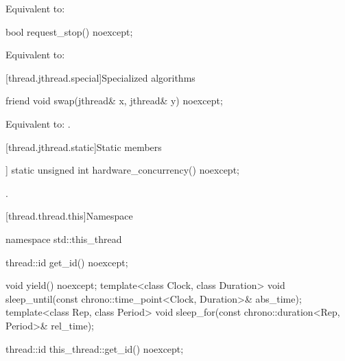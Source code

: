 \begin{itemdescr}
\pnum
\effects
Equivalent to: 
\end{itemdescr}

%
\begin{itemdecl}
bool request_stop() noexcept;
\end{itemdecl}

\begin{itemdescr}
\pnum
\effects
Equivalent to: 
\end{itemdescr}


[thread.jthread.special]{Specialized algorithms}

%
\begin{itemdecl}
friend void swap(jthread& x, jthread& y) noexcept;
\end{itemdecl}

\begin{itemdescr}
\pnum
\effects
Equivalent to: .
\end{itemdescr}

[thread.jthread.static]{Static members}

%
\begin{itemdecl}
[[nodiscard]] static unsigned int hardware_concurrency() noexcept;
\end{itemdecl}

\begin{itemdescr}
\pnum
\returns
{}.
\end{itemdescr}


[thread.thread.this]{Namespace }

\begin{codeblock}
namespace std::this_thread {
  thread::id get_id() noexcept;

  void yield() noexcept;
  template<class Clock, class Duration>
    void sleep_until(const chrono::time_point<Clock, Duration>& abs_time);
  template<class Rep, class Period>
    void sleep_for(const chrono::duration<Rep, Period>& rel_time);
}
\end{codeblock}

%
\begin{itemdecl}
thread::id this_thread::get_id() noexcept;
\end{itemdecl}


